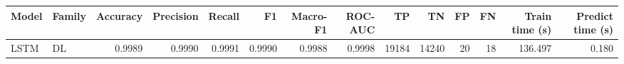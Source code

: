 \begin{tabular}{llrrrrrrrrrrrr}
\toprule
Model & Family & Accuracy & Precision & Recall & F1 & Macro-F1 & ROC-AUC & TP & TN & FP & FN & Train time (s) & Predict time (s) \\
\midrule
LSTM & DL & 0.9989 & 0.9990 & 0.9991 & 0.9990 & 0.9988 & 0.9998 & 19184 & 14240 & 20 & 18 & 136.497 & 0.180 \\
\bottomrule
\end{tabular}
